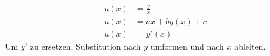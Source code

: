     \begin{align*}
        u(x) &= \frac{y}{x}\\
        u(x) &= ax + by(x) + c\\
        u(x) &= y'(x)    
    \end{align*}
    Um $y'$ zu ersetzen, Substitution nach $y$ umformen und nach $x$ ableiten.